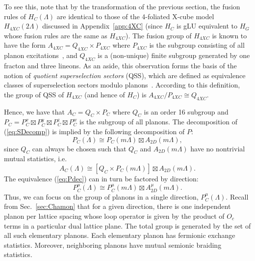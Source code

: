 \documentclass[prx,twocolumn,superscriptaddress,nofootinbib,showpacs,notitlepage]{revtex4-2}
\begin{document}
To see this, note that by the transformation of the previous section, the fusion rules of $H_C(\Lambda)$ are identical to those of the 4-foliated X-cube model $H_{4XC}(2\Lambda)$ discussed in Appendix~\ref{app:4XC} (since $H_C$ is gLU equivalent to $H_G$ whose fusion rules are the same as $H_{4XC}$). The fusion group of $H_{4XC}$ is known to have the form $A_{4XC}=Q_{4XC}\times P_{4XC}$ where $P_{4XC}$ is the subgroup consisting of all planon excitations~\cite{shirley2018Fractional}, and $Q_{4XC}$ is a (non-unique) finite subgroup generated by one fracton and three lineons. As an aside, this observation forms the basis of the notion of \textit{quotient superselection sectors} (QSS), which are defined as equivalence classes of superselection sectors modulo planons~\cite{shirley2018Fractional}. According to this definition, the group of QSS of $H_{4XC}$ (and hence of $H_C$) is $A_{4XC}/P_{4XC}\cong Q_{4XC}$.

Hence, we have that $A_C=Q_C\times P_C$ where $Q_C$ is an order 16 subgroup and $P_C=P^x_C\boxtimes P^y_C\boxtimes P^z_C\boxtimes P^w_C$ is the subgroup of all planons. The decomposition of (\ref{eq:SDecomp}) is implied by the following decomposition of $P$:
\begin{equation}
    P_C(\Lambda)\cong P_C(m\Lambda)\boxtimes A_{2D}(m\Lambda),
    \label{eq:Pdec}
\end{equation}
since $Q_C$ can always be chosen such that $Q_C$ and $A_{2D}(m\Lambda)$ have no nontrivial mutual statistics, i.e.
\begin{equation}
    A_C(\Lambda)\cong \left[Q_C\times P_C(m\Lambda)\right]\boxtimes A_{2D}(m\Lambda).
\end{equation}
The equivalence (\ref{eq:Pdec}) can in turn be factored by direction:
\begin{equation}
    P_C^\mu(\Lambda)\cong P_C^\mu(m\Lambda)\boxtimes A_{2D}^\mu(m\Lambda).
\end{equation}
Thus, we can focus on the group of planons in a single direction, $P^\mu_C(\Lambda)$. Recall from Sec.~\ref{sec:Chamon} that for a given direction, there is one independent planon per lattice spacing whose loop operator is given by the product of $O_c$ terms in a particular dual lattice plane. The total group is generated by the set of all such elementary planons. Each elementary planon has fermionic exchange statistics. Moreover, neighboring planons have mutual semionic braiding statistics.
\end{document}
